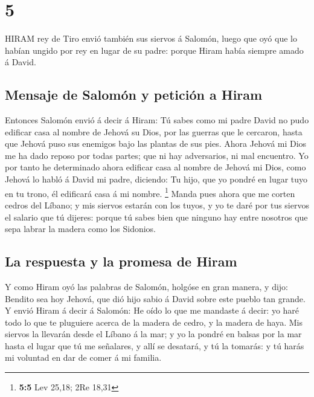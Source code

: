 \hypertarget{section-4}{%
\section{5}\label{section-4}}

 HIRAM rey de Tiro envió también sus siervos á Salomón,
luego que oyó que lo habían ungido por rey en lugar de su padre: porque
Hiram había siempre amado á David.

\hypertarget{mensaje-de-salomuxf3n-y-peticiuxf3n-a-hiram}{%
\subsection{Mensaje de Salomón y petición a
Hiram}\label{mensaje-de-salomuxf3n-y-peticiuxf3n-a-hiram}}

 Entonces Salomón envió á decir á Hiram:  Tú
sabes como mi padre David no pudo edificar casa al nombre de Jehová su
Dios, por las guerras que le cercaron, hasta que Jehová puso sus
enemigos bajo las plantas de sus pies.  Ahora Jehová mi Dios
me ha dado reposo por todas partes; que ni hay adversarios, ni mal
encuentro.  Yo por tanto he determinado ahora edificar casa
al nombre de Jehová mi Dios, como Jehová lo habló á David mi padre,
diciendo: Tu hijo, que yo pondré en lugar tuyo en tu trono, él edificará
casa á mi nombre. \footnote{\textbf{5:5} Lev 25,18; 2Re 18,31}
 Manda pues ahora que me corten cedros del Líbano; y mis
siervos estarán con los tuyos, y yo te daré por tus siervos el salario
que tú dijeres: porque tú sabes bien que ninguno hay entre nosotros que
sepa labrar la madera como los Sidonios.

\hypertarget{la-respuesta-y-la-promesa-de-hiram}{%
\subsection{La respuesta y la promesa de
Hiram}\label{la-respuesta-y-la-promesa-de-hiram}}

 Y como Hiram oyó las palabras de Salomón, holgóse en gran
manera, y dijo: Bendito sea hoy Jehová, que dió hijo sabio á David sobre
este pueblo tan grande.  Y envió Hiram á decir á Salomón: He
oído lo que me mandaste á decir: yo haré todo lo que te pluguiere acerca
de la madera de cedro, y la madera de haya.  Mis siervos la
llevarán desde el Líbano á la mar; y yo la pondré en balsas por la mar
hasta el lugar que tú me señalares, y allí se desatará, y tú la tomarás:
y tú harás mi voluntad en dar de comer á mi familia.

